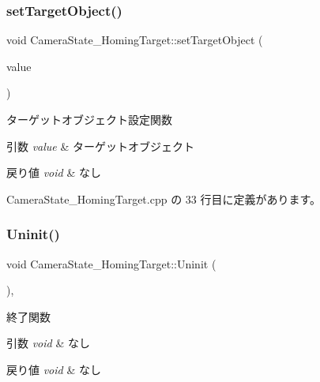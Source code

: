 \subsubsection{\texorpdfstring{set\+Target\+Object()}{setTargetObject()}}
{\footnotesize\ttfamily void Camera\+State\+\_\+\+Homing\+Target\+::set\+Target\+Object (\begin{DoxyParamCaption}\item[{\mbox{\hyperlink{class_game_object_base}{Game\+Object\+Base}} $\ast$}]{value }\end{DoxyParamCaption})}



ターゲットオブジェクト設定関数 


\begin{DoxyParams}{引数}
{\em value} & ターゲットオブジェクト \\
\hline
\end{DoxyParams}

\begin{DoxyRetVals}{戻り値}
{\em void} & なし \\
\hline
\end{DoxyRetVals}


 Camera\+State\+\_\+\+Homing\+Target.\+cpp の 33 行目に定義があります。

\mbox{\label{class_camera_state___homing_target_ab2b5379b35ebafc53189bf4d45646c8c}} 
\subsubsection{\texorpdfstring{Uninit()}{Uninit()}}
{\footnotesize\ttfamily void Camera\+State\+\_\+\+Homing\+Target\+::\+Uninit (\begin{DoxyParamCaption}{ }\end{DoxyParamCaption})\hspace{0.3cm}{\ttfamily [override]}, {\ttfamily [virtual]}}



終了関数 


\begin{DoxyParams}{引数}
{\em void} & なし \\
\hline
\end{DoxyParams}

\begin{DoxyRetVals}{戻り値}
{\em void} & なし \\
\hline
\end{DoxyRetVals}


